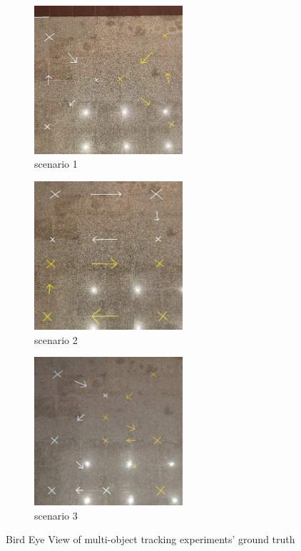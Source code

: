 \begin{figure}[!htb]
    \centering
    \begin{subfigure}{0.25\linewidth}
        \includegraphics[width=5.5cm]{Figures/scenario_1_gt.png}
        \caption{scenario 1}
        \label{subfig:scenario1gt}
    \end{subfigure}
    \hfill
    \begin{subfigure}{0.25\linewidth}
        \centering
        \includegraphics[width=5.5cm]{Figures/scenario_2_gt.png}
        \caption{scenario 2}
        \label{subfig:scenario2gt}
    \end{subfigure}
    \hfill
    \begin{subfigure}{0.25\linewidth}
        \centering
        \includegraphics[width=5.5cm]{Figures/scenario_3_gt.jpg}
        \caption{scenario 3}
        \label{subfig:scenario3gt}
    \end{subfigure}

    \caption{Bird Eye View of multi-object tracking experiments' ground truth}
    \label{fig:ground_truth}
\end{figure}

